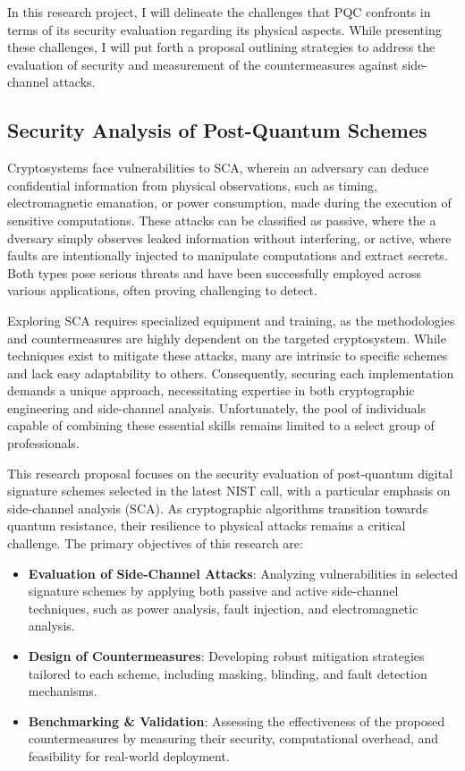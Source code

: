 \documentclass[11pt, a4paper]{article}
\begin{document}
In this research project, I will delineate the challenges that PQC confronts 
in terms of its security evaluation regarding its physical aspects. While presenting these challenges, 
I will put forth a proposal outlining strategies to address the evaluation of security and measurement of 
the countermeasures against side-channel attacks. 

\subsection*{Security Analysis of Post-Quantum Schemes}\label{sec:an}\vspace{-0.1cm}

Cryptosystems face vulnerabilities to SCA, wherein an adversary can deduce 
confidential information from physical observations, such as timing,
electromagnetic emanation, or power consumption, made during the execution of 
sensitive computations. These attacks can be classified as passive, where the a
dversary simply observes leaked information without interfering, or active, 
where faults are intentionally injected to manipulate computations and extract 
secrets. Both types pose serious threats and have been successfully employed 
across various applications, often proving challenging to detect.

Exploring SCA requires specialized equipment and training, as the 
methodologies and countermeasures are highly dependent on the targeted 
cryptosystem. While techniques exist to mitigate these attacks, many are 
intrinsic to specific schemes and lack easy adaptability to others. Consequently, 
securing each implementation demands a unique approach, necessitating 
expertise in both cryptographic engineering and side-channel analysis. 
Unfortunately, the pool of individuals capable of combining these
essential skills remains limited to a select group of professionals.


This research proposal focuses on the security evaluation of post-quantum digital signature schemes selected in the latest NIST call, with a particular emphasis on side-channel analysis (SCA). As cryptographic algorithms transition towards quantum resistance, their resilience to physical attacks remains a critical challenge. The primary objectives of this research are:

\begin{itemize}
    \item \textbf{Evaluation of Side-Channel Attacks}: Analyzing vulnerabilities in selected signature schemes by applying both passive and active side-channel techniques, such as power analysis, fault injection, and electromagnetic analysis.
    \item \textbf{Design of Countermeasures}: Developing robust mitigation strategies tailored to each scheme, including masking, blinding, and fault detection mechanisms.
    \item \textbf{Benchmarking \& Validation}: Assessing the effectiveness of the proposed countermeasures by measuring their security, computational overhead, and feasibility for real-world deployment.
\end{itemize}
\end{document}
